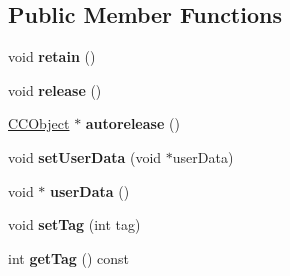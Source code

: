 \subsection*{Public Member Functions}
\begin{DoxyCompactItemize}
\item 
\hypertarget{class_g_a_f_1_1_c_c_object_a92d6be0cf04da2919e9039bef31f8584}{void {\bfseries retain} ()}\label{class_g_a_f_1_1_c_c_object_a92d6be0cf04da2919e9039bef31f8584}

\item 
\hypertarget{class_g_a_f_1_1_c_c_object_ab05fb1b3a8729e96ca23ddbe62c2d1c4}{void {\bfseries release} ()}\label{class_g_a_f_1_1_c_c_object_ab05fb1b3a8729e96ca23ddbe62c2d1c4}

\item 
\hypertarget{class_g_a_f_1_1_c_c_object_a4e3d530ba069913a6e5708ea3fbf2491}{\hyperlink{class_g_a_f_1_1_c_c_object}{C\-C\-Object} $\ast$ {\bfseries autorelease} ()}\label{class_g_a_f_1_1_c_c_object_a4e3d530ba069913a6e5708ea3fbf2491}

\item 
\hypertarget{class_g_a_f_1_1_c_c_object_ad2498666cde8606d0b113fca7a0ebf41}{void {\bfseries set\-User\-Data} (void $\ast$user\-Data)}\label{class_g_a_f_1_1_c_c_object_ad2498666cde8606d0b113fca7a0ebf41}

\item 
\hypertarget{class_g_a_f_1_1_c_c_object_adae0a97b469059ea1766bdc6eaf65c02}{void $\ast$ {\bfseries user\-Data} ()}\label{class_g_a_f_1_1_c_c_object_adae0a97b469059ea1766bdc6eaf65c02}

\item 
\hypertarget{class_g_a_f_1_1_c_c_object_a1bc5736a053deff185e344503a582ef8}{void {\bfseries set\-Tag} (int tag)}\label{class_g_a_f_1_1_c_c_object_a1bc5736a053deff185e344503a582ef8}

\item 
\hypertarget{class_g_a_f_1_1_c_c_object_ab5a4e313567c5c1e2791570385ba6873}{int {\bfseries get\-Tag} () const }\label{class_g_a_f_1_1_c_c_object_ab5a4e313567c5c1e2791570385ba6873}

\end{DoxyCompactItemize}



